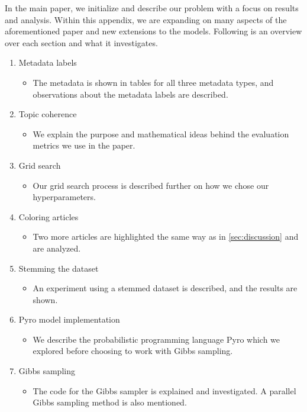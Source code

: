 In the main paper, we initialize and describe our problem with a focus on results and analysis.
Within this appendix, we are expanding on many aspects of the aforementioned paper and new extensions to the models.
Following is an overview over each section and what it investigates.

\begin{enumerate}
	\item Metadata labels
	\begin{itemize}
		\item The metadata is shown in tables for all three metadata types, and observations about the metadata labels are described.
	\end{itemize} 
	\item Topic coherence
	\begin{itemize}
		\item We explain the purpose and mathematical ideas behind the evaluation metrics we use in the paper.
	\end{itemize} 
	\item Grid search 
	\begin{itemize}
		\item Our grid search process is described further on how we chose our hyperparameters.
	\end{itemize}
	\item Coloring articles 
	\begin{itemize}
		\item Two more articles are highlighted the same way as in \autoref{sec:discussion} and are analyzed.
	\end{itemize}
	\item Stemming the dataset 
	\begin{itemize}
		\item An experiment using a stemmed dataset is described, and the results are shown.
	\end{itemize}
	\item Pyro model implementation
	\begin{itemize}
		\item We describe the probabilistic programming language Pyro which we explored before choosing to work with Gibbs sampling.
	\end{itemize}
	\item Gibbs sampling
	\begin{itemize}
		\item The code for the Gibbs sampler is explained and investigated. A parallel Gibbs sampling method is also mentioned.

\end{itemize}
\end{enumerate}
